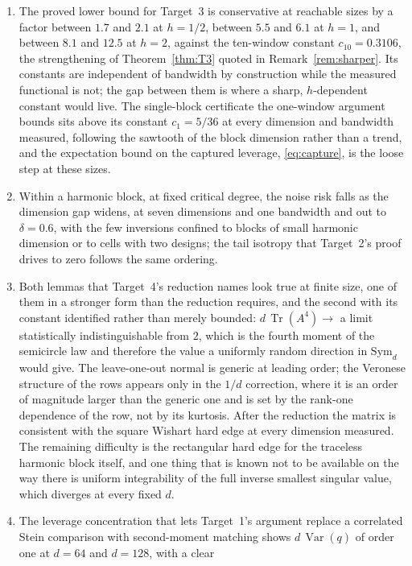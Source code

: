 \documentclass[11pt]{article}
\theoremstyle{definition}
\DeclareMathOperator{\Tr}{Tr}
\DeclareMathOperator{\Var}{Var}
\newcommand{\numCten}{0.3106}
\newcommand{\numRatioMaxHalf}{2.1}
\newcommand{\numRatioMaxOne}{6.1}
\newcommand{\numRatioMaxTwo}{12.5}
\newcommand{\numRatioMinHalf}{1.7}
\newcommand{\numRatioMinOne}{5.5}
\newcommand{\numRatioMinTwo}{8.1}
\begin{document}
\begin{enumerate}
\item The proved lower bound for Target~3 is conservative at reachable sizes by a factor between
$\numRatioMinHalf$ and $\numRatioMaxHalf$ at $h=1/2$, between $\numRatioMinOne$ and
$\numRatioMaxOne$ at $h=1$, and between $\numRatioMinTwo$ and $\numRatioMaxTwo$ at $h=2$, against
the ten-window constant $c_{10}=\numCten$, the strengthening of Theorem~\ref{thm:T3} quoted in
Remark~\ref{rem:sharper}. Its constants are independent of bandwidth by construction while the
measured functional is not; the gap between them is where a sharp,
$h$-dependent constant would live. The single-block certificate the one-window argument bounds sits
above its constant $c_1=5/36$ at every dimension and bandwidth measured, following the sawtooth of
the block dimension rather than a trend, and the expectation bound on the captured leverage,
\eqref{eq:capture}, is the loose step at these sizes.
\item Within a harmonic block, at fixed critical degree, the noise risk falls as the dimension gap
widens, at seven dimensions and one bandwidth and out to $\delta=0.6$, with the few inversions
confined to blocks of small harmonic dimension or to cells with two designs; the tail isotropy that
Target~2's proof
drives to zero follows the same ordering.
\item Both lemmas that Target~4's reduction names look true at finite size, one of them in a
stronger form than the reduction requires, and the second with its constant identified rather than
merely bounded: $d\,\Tr(A^4)\to$ a limit statistically indistinguishable from $2$, which is the
fourth moment of the semicircle law and therefore the value a uniformly random direction in
$\mathrm{Sym}_d$ would give. The leave-one-out normal is generic at leading order; the Veronese
structure of the rows appears only in the $1/d$ correction, where it is an order of magnitude larger
than the generic one and is set by the rank-one dependence of the row, not by its kurtosis. After the
reduction the matrix is consistent with the square Wishart hard edge at every dimension measured.
The remaining difficulty is the rectangular hard edge for the traceless harmonic block itself, and
one thing that is known not to be available on the way there is uniform integrability of the full
inverse smallest singular value, which diverges at every fixed $d$.
\item The leverage concentration that lets Target~1's argument replace a correlated Stein comparison
with second-moment matching shows $d\,\Var(q)$ of order one at $d=64$ and $d=128$, with a clear

\end{enumerate}
\end{document}
